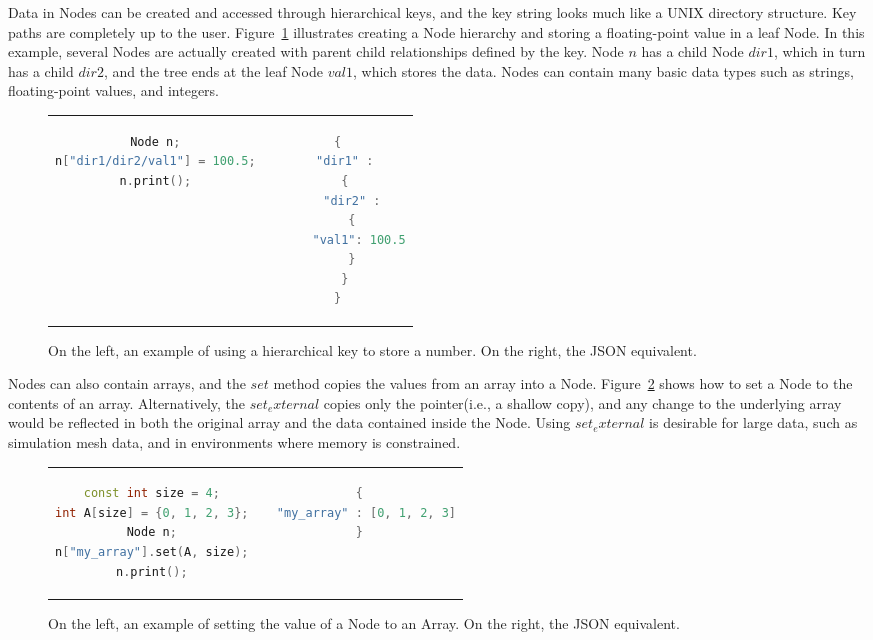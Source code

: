 Data in Nodes can be created and accessed through hierarchical keys,
and the key string looks much like a UNIX directory structure.
%
Key paths are completely up to the user.
%
Figure~\ref{ex:2} illustrates creating a Node hierarchy
and storing a floating-point value in a leaf Node.
%
In this example, several Nodes are actually created with parent child
relationships defined by the key.
%
Node $n$ has a child Node $dir1$, which in turn has a child $dir2$,
and the tree ends at the leaf Node $val1$, which stores the data.
%
Nodes can contain many basic data types such as strings,
floating-point values, and integers.

\begin{figure}
\begin{tabular}{cc}
  \begin{minipage}{.5\textwidth}
  \centering
    \begin{lstlisting}[language=C++]
Node n;
n["dir1/dir2/val1"] = 100.5;
n.print();
    \end{lstlisting}
  \end{minipage}
  &
  \begin{minipage}{.5\textwidth}
  \centering
  \begin{lstlisting}[language=C++]
{
  "dir1" :
  {
    "dir2" :
    {
      "val1": 100.5
    }
  }
}
  \end{lstlisting}
  \end{minipage}
\end{tabular}
\caption{\label{ex:2}On the left, an example of using a hierarchical key to store a number. On the right, the JSON equivalent.}
\end{figure}

Nodes can also contain arrays, and the $set$ method
copies the values from an array into a Node.
%
Figure~\ref{ex:3} shows how to set a Node to the contents of an array.
%
Alternatively, the $set_external$ copies only the pointer(i.e., a shallow copy),
and any change to the underlying array would be reflected in both the original
array and the data contained inside the Node.
%
Using $set_external$ is desirable for large data, such as simulation mesh data,
and in environments where memory is constrained.

\begin{figure}
\begin{tabular}{cc}
  \begin{minipage}{.5\textwidth}
  \centering
    \begin{lstlisting}[language=C++]
const int size = 4;
int A[size] = {0, 1, 2, 3};
Node n;
n["my_array"].set(A, size);
n.print();
    \end{lstlisting}
  \end{minipage}
  &
  \begin{minipage}{.5\textwidth}
  \centering
  \begin{lstlisting}[language=C++]
{
  "my_array" : [0, 1, 2, 3]
}
  \end{lstlisting}
  \end{minipage}
\end{tabular}

\caption{\label{ex:3}On the left, an example of setting the value of a Node to an Array. On the right, the JSON equivalent.}
\end{figure}

